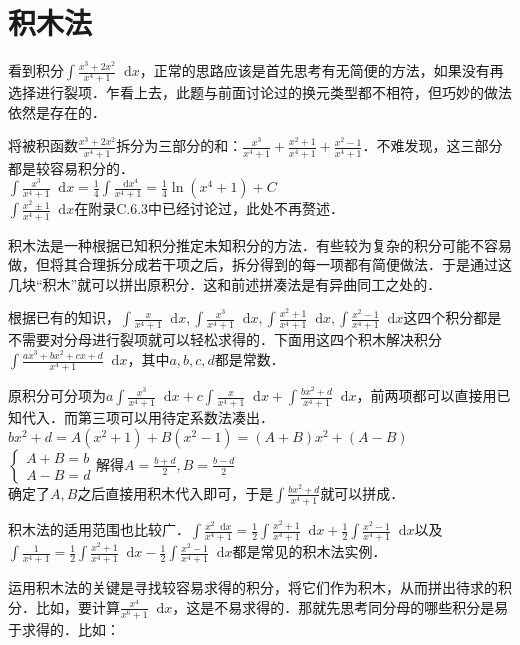 \documentclass{ctexbook}
\newcommand*{\dif}{\mathop{}\!\mathrm{d}}
\begin{document}
\section{积木法}
看到积分$\int\frac{x^{3}+2x^{2}}{x^{4}+1}\dif{x}$，正常的思路应该是首先思考有无简便的方法，如果没有再选择进行裂项．乍看上去，此题与前面讨论过的换元类型都不相符，但巧妙的做法依然是存在的．\par
将被积函数$\frac{x^{3}+2x^{2}}{x^{4}+1}$拆分为三部分的和：$\frac{x^{3}}{x^{4}+1}+\frac{x^{2}+1}{x^{4}+1}+\frac{x^{2}-1}{x^{4}+1}$．不难发现，这三部分都是较容易积分的．\\
$\int\frac{x^{3}}{x^{4}+1}\dif{x}=\frac{1}{4}\int\frac{\dif{x}^{4}}{x^{4}+1}=\frac{1}{4}\ln{\left(x^{4}+1\right)}+C$\\
$\int\frac{x^{2}\pm1}{x^{4}+1}\dif{x}$在附录C.6.3中已经讨论过，此处不再赘述．\par
积木法是一种根据已知积分推定未知积分的方法．有些较为复杂的积分可能不容易做，但将其合理拆分成若干项之后，拆分得到的每一项都有简便做法．于是通过这几块“积木”就可以拼出原积分．这和前述拼凑法是有异曲同工之处的．\par
根据已有的知识，$\int\frac{x}{x^{4}+1}\dif{x},\int\frac{x^{3}}{x^{4}+1}\dif{x},\int\frac{x^{2}+1}{x^{4}+1}\dif{x},\int\frac{x^{2}-1}{x^{4}+1}\dif{x}$这四个积分都是不需要对分母进行裂项就可以轻松求得的．下面用这四个积木解决积分$\int\frac{ax^{3}+bx^{2}+cx+d}{x^{4}+1}\dif{x}$，其中$a,b,c,d$都是常数．\par
原积分可分项为$a\int\frac{x^{3}}{x^{4}+1}\dif{x}+c\int\frac{x}{x^{4}+1}\dif{x}+\int\frac{bx^{2}+d}{x^{4}+1}\dif{x}$，前两项都可以直接用已知代入．而第三项可以用待定系数法凑出．\\
$bx^{2}+d=A\left(x^{2}+1\right)+B\left(x^{2}-1\right)=\left(A+B\right)x^{2}+\left(A-B\right)$\\
$\begin{cases}A+B=b\\A-B=d\end{cases}$解得$A=\frac{b+d}{2},B=\frac{b-d}{2}$\\
确定了$A,B$之后直接用积木代入即可，于是$\int\frac{bx^{2}+d}{x^{4}+1}$就可以拼成．\par
积木法的适用范围也比较广．$\int\frac{x^{2}\dif{x}}{x^{4}+1}=\frac{1}{2}\int\frac{x^{2}+1}{x^{4}+1}\dif{x}+\frac{1}{2}\int\frac{x^{2}-1}{x^{4}+1}\dif{x}$以及$\int\frac{1}{x^{4}+1}=\frac{1}{2}\int\frac{x^{2}+1}{x^{4}+1}\dif{x}-\frac{1}{2}\int\frac{x^{2}-1}{x^{4}+1}\dif{x}$都是常见的积木法实例．\par
运用积木法的关键是寻找较容易求得的积分，将它们作为积木，从而拼出待求的积分．比如，要计算$\frac{x^{4}}{x^{6}+1}\dif{x}$，这是不易求得的．那就先思考同分母的哪些积分是易于求得的．比如：\\
\end{document}
